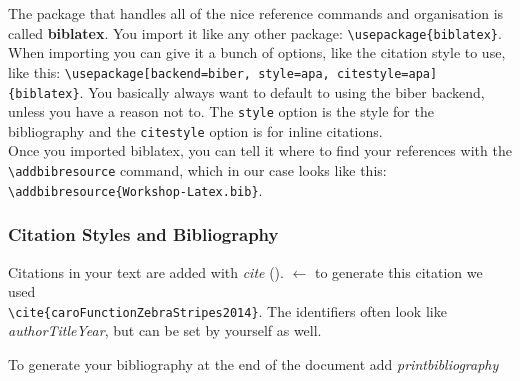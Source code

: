 \documentclass[12pt]{scrarticle}
\begin{document}
The package that handles all of the nice reference commands and organisation is called \textbf{biblatex}. You import it like any other package: \texttt{\textbackslash usepackage\{biblatex\}}. When importing you can give it a bunch of options, like the citation style to use, like this: \texttt{\textbackslash usepackage[backend=biber, style=apa, citestyle=apa]\{biblatex\}}. You basically always want to default to using the biber backend, unless you have a reason not to. The \texttt{style} option is the style for the bibliography and the \texttt{citestyle} option is for inline citations.\\
Once you imported biblatex, you can tell it where to find your references with the \texttt{\textbackslash addbibresource} command, which in our case looks like this:\\
\texttt{\textbackslash addbibresource\{Workshop-Latex.bib\}}.

\subsubsection{Citation Styles and Bibliography}

Citations in your text are added with \textit{cite} (\cite{caroFunctionZebraStripes2014}). $\leftarrow$ to generate this citation we used\\
\texttt{\textbackslash cite\{caroFunctionZebraStripes2014\}}. The identifiers often look like \textit{authorTitleYear}, but can be set by yourself as well.

To generate your bibliography at the end of the document add \textit{printbibliography}

\printbibliography
\end{document}

